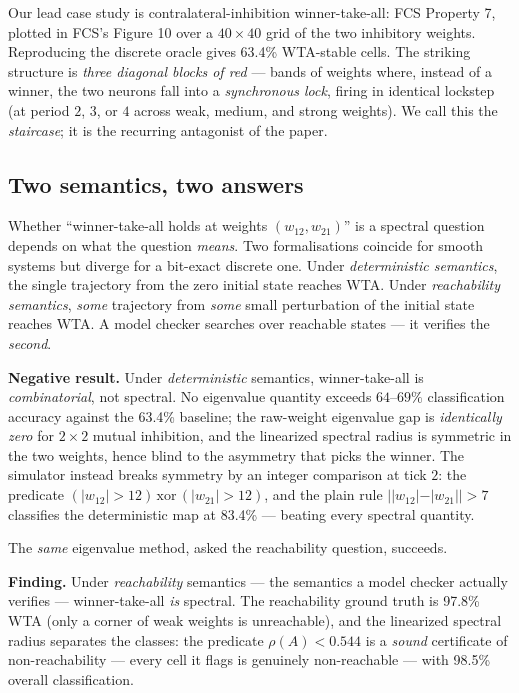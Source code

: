 \documentclass[conference]{IEEEtran}
\begin{document}
Our lead case study is contralateral-inhibition winner-take-all: FCS Property
7, plotted in FCS's Figure 10 over a $40 \times 40$ grid of the two inhibitory
weights. Reproducing the discrete oracle gives 63.4\% WTA-stable cells. The
striking structure is \emph{three diagonal blocks of red} --- bands of weights
where, instead of a winner, the two neurons fall into a \emph{synchronous
lock}, firing in identical lockstep (at period $2$, $3$, or $4$ across weak,
medium, and strong weights). We call this the \emph{staircase}; it is the
recurring antagonist of the paper.

\subsection{Two semantics, two answers}\label{sec:wta-semantics}

Whether ``winner-take-all holds at weights $(w_{12},w_{21})$'' is a spectral
question depends on what the question \emph{means}. Two formalisations coincide
for smooth systems but diverge for a bit-exact discrete one. Under
\emph{deterministic semantics}, the single trajectory from the zero initial
state reaches WTA. Under \emph{reachability semantics}, \emph{some} trajectory
from \emph{some} small perturbation of the initial state reaches WTA. A model
checker searches over reachable states --- it verifies the \emph{second}.

\par\smallskip\noindent\textbf{Negative result.} Under \emph{deterministic}
semantics, winner-take-all is \emph{combinatorial}, not spectral. No eigenvalue
quantity exceeds $64$--$69\%$ classification accuracy against the 63.4\%
baseline; the raw-weight eigenvalue gap is \emph{identically zero} for $2
\times 2$ mutual inhibition, and the linearized spectral radius is symmetric in
the two weights, hence blind to the asymmetry that picks the winner. The
simulator instead breaks symmetry by an integer comparison at tick $2$: the
predicate $(|w_{12}|>12)\,\mathrm{xor}\,(|w_{21}|>12)$, and the plain rule
$||w_{12}|-|w_{21}||>7$ classifies the deterministic map at 83.4\% --- beating
every spectral quantity.
\par\smallskip

The \emph{same} eigenvalue method, asked the reachability question, succeeds.

\par\smallskip\noindent\textbf{Finding.} Under \emph{reachability} semantics ---
the semantics a model checker actually verifies --- winner-take-all \emph{is}
spectral. The reachability ground truth is 97.8\% WTA (only a corner of weak
weights is unreachable), and the linearized spectral radius separates the
classes: the predicate $\rho(A) < 0.544$ is a \emph{sound} certificate of
non-reachability --- every cell it flags is genuinely non-reachable --- with
98.5\% overall classification.
\par\smallskip
\end{document}
